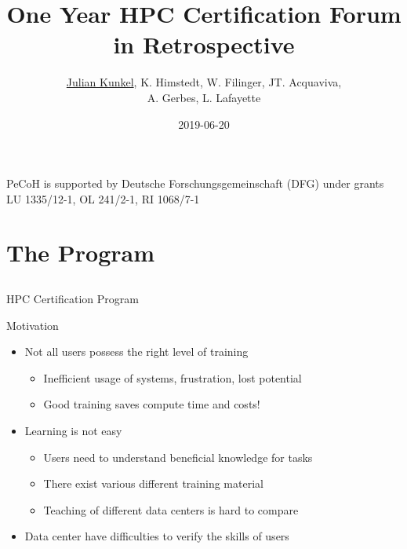 \documentclass[compress,aspectratio=169]{beamer}
\subtitle{}
\title{\Large One Year HPC Certification Forum in Retrospective}
\author{\underline{Julian Kunkel}, K. Himstedt, W. Filinger, JT. Acquaviva, \\ A. Gerbes, L. Lafayette}
\date{2019-06-20}
\institute{Department of Computer Science}
\begin{document}
\begin{frame}[plain]{}
	\maketitle
	{\fontsize{5.85pt}{6pt}\selectfont PeCoH is supported by Deutsche Forschungsgemeinschaft (DFG) under grants LU 1335/12-1, OL 241/2-1, RI 1068/7-1}
\end{frame}


\section{The Program}
\sectionIntroHidden

\subsection{}

\begin{frame}{HPC Certification Program}
	\begin{block}{Motivation}
		\begin{itemize}

			\item Not all users possess the right level of training
				\begin{itemize}
				\item Inefficient usage of systems, frustration, lost potential
				\item Good training saves compute time and costs!
				\end{itemize}
			\item Learning is not easy
			\begin{itemize}
				\item Users need to understand beneficial knowledge for tasks
				\item There exist various different training material
				\item Teaching of different data centers is hard to compare
			\end{itemize}
			\item Data center have difficulties to verify the skills of users
		\end{itemize}
	\end{block}

\end{frame}
\end{document}
